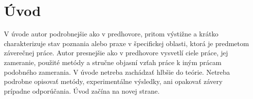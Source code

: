 \chapter*{Úvod}

V úvode autor podrobnejšie ako v predhovore, pritom výstižne a krátko charakterizuje stav poznania alebo praxe v špecifickej oblasti, ktorá je predmetom záverečnej práce. Autor presnejšie ako v predhovore vysvetlí ciele práce, jej zameranie, použité metódy a stručne objasní vzťah práce k iným prácam podobného zamerania. V úvode netreba zachádzať hlbšie do teórie. Netreba podrobne opisovať metódy, experimentálne výsledky, ani opakovať závery prípadne odporúčania.
Úvod začína na novej  strane.
